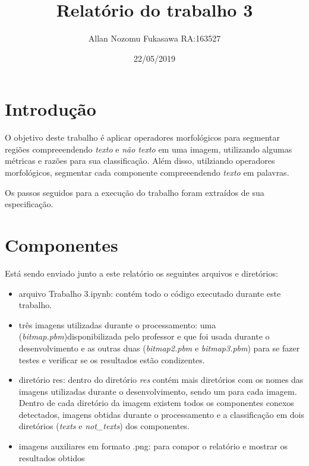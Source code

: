 \documentclass{article}
\title{Relatório do trabalho 3}
\date{22/05/2019}
\author{Allan Nozomu Fukasawa RA:163527}
\begin{document}
\maketitle

\section{Introdução}

O objetivo deste trabalho é aplicar operadores morfológicos para segmentar regiões compreeendendo \textit{texto} e \textit{não texto} em uma imagem, utilizando algumas métricas e razões para sua classificação. Além disso, utilziando operadores morfológicos, segmentar cada componente compreeendendo \textit{texto} em palavras.

Os passos seguidos para a execução do trabalho foram extraídos de sua especificação. \cite{Helio:1}

\section{Componentes}

Está sendo enviado junto a este relatório os seguintes arquivos e diretórios:

\begin{itemize}
  \item arquivo Trabalho 3.ipynb: contém todo o código executado durante este trabalho.

  \item três imagens utilizadas durante o processamento: uma (\textit{bitmap.pbm})disponibilizada pelo professor e que foi usada durante o desenvolvimento e as outras duas (\textit{bitmap2.pbm} e \textit{bitmap3.pbm}) para se fazer testes e verificar se os resultados estão condizentes.

  \item diretório res: dentro do diretório \textit{res} contém mais diretórios com os nomes das imagens utilizadas durante o desenvolvimento, sendo um para cada imagem. Dentro de cada diretório da imagem existem todos os componentes conexos detectados, imagens obtidas durante o processamento e a classificação em dois diretórios (\textit{texts} e \textit{not\_texts}) dos componentes.
  
  \item imagens auxiliares em formato .png: para compor o relatório e mostrar os resultados obtidos
  
\end{itemize}
\end{document}
